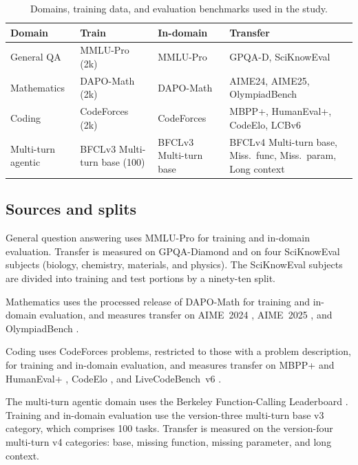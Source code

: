 \documentclass{article}
\begin{document}
\begin{table}[t]
\centering
\footnotesize
\caption{Domains, training data, and evaluation benchmarks used in the study.}
\label{app:tab:domains}
\begin{tabular}{p{}p{}p{}p{}}
\toprule
\textbf{Domain} & \textbf{Train} & \textbf{In-domain} & \textbf{Transfer} \\
\midrule
General QA & MMLU-Pro (2k) & MMLU-Pro & GPQA-D, SciKnowEval \\
Mathematics & DAPO-Math (2k) & DAPO-Math & AIME24, AIME25, OlympiadBench \\
Coding & CodeForces (2k) & CodeForces & MBPP+, HumanEval+, CodeElo, LCBv6 \\
Multi-turn agentic & BFCLv3 Multi-turn base (100) & BFCLv3 Multi-turn base & BFCLv4 Multi-turn base, Miss.\ func, Miss.\ param, Long context \\
\bottomrule
\end{tabular}
\end{table}

\subsection{Sources and splits}
\label{app:sub:sources}

General question answering uses MMLU-Pro \citep{mmlupro2024} for training and
in-domain evaluation. Transfer is measured on GPQA-Diamond
\citep{gpqa2023} and on four SciKnowEval \citep{sciknoweval2024} subjects
(biology, chemistry, materials, and physics). The SciKnowEval subjects are
divided into training and test portions by a ninety-ten split.

Mathematics uses the processed release of DAPO-Math
\citep{dapo2025,dapomathprocessed2025} for training and in-domain evaluation, and
measures transfer on AIME~2024 \citep{aime2024}, AIME~2025 \citep{aime2025}, and
OlympiadBench \citep{olympiadbench2024}.

Coding uses CodeForces \citep{codeforcesdata2025} problems, restricted to those
with a problem description, for training and in-domain evaluation, and measures
transfer on MBPP+ and HumanEval+ \citep{mbpp2021,humaneval2021,evalplus2023},
CodeElo \citep{codeelo2025}, and LiveCodeBench~v6 \citep{lcb2025}.

The multi-turn agentic domain uses the Berkeley Function-Calling Leaderboard
\citep{bfcl2024}. Training and in-domain evaluation use the version-three
multi-turn base v3 category, which comprises 100 tasks. Transfer is measured on the
version-four multi-turn v4 categories: base, missing function, missing parameter,
and long context.
\end{document}

